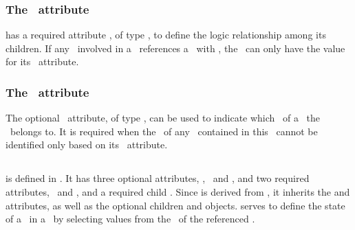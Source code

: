 \subsubsection{The \relationAtt\ attribute}
\label{def:SubListOfSpeciesFeatures:relation}

\SubListOfSpeciesFeatures has a required attribute \relationAtt, of type \RelationPTWC, to define the logic relationship among its children. 
If any \speciesFeature\ involved in a \subListOfSpeciesFeatures\ references a \speciesFeatureTypeAtt\ with , the \subListOfSpeciesFeatures\ can only have the value  for its \relationAtt\ attribute. 

\subsubsection{The \componentAtt\ attribute}
\label{def:SubListOfSpeciesFeatures:component}

The optional \componentAtt\ attribute, of type \SIdRefPT, can be used to indicate which \componentWR\ of a \species\ the \subListOfSpeciesFeatures\ belongs to. It is required when the \component\ of any \speciesFeature\ contained in this \subListOfSpeciesFeatures\ cannot be identified only based on its \speciesFeatureTypeAtt\ attribute.

\subsection{}
\label{def:SpeciesFeature}

 is defined in .  It has three optional attributes, \idAtt, \nameAtt\ and \componentAtt, and two required attributes, \speciesFeatureTypeAtt\ and \occurAtt, and a required child \listOfSpeciesFeatureValues. Since  is derived from , it inherits the  and  attributes, as well as the optional children  and  objects.  serves to define the state of a \component\ in a \species\ by selecting values from the \listOfPossibleSpeciesFeatureValues\ of the referenced \speciesFeatureType. 

